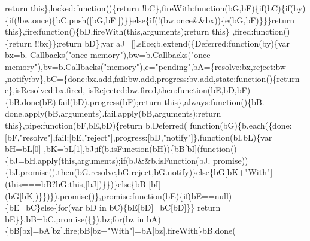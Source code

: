 \begin{DoxyCode}
{      return} \textcolor{keyword}{this}\},locked:\textcolor{keyword}{function}()\{\textcolor{keywordflow}{return} !bC\},fireWith:\textcolor{keyword}{function}(bG,bF)\{\textcolor{keywordflow}{if}(bC)\{\textcolor{keywordflow}{if}(by)\{\textcolor{keywordflow}{if}(!bw.once)\{bC.push([bG,bF
      ])\}\}\textcolor{keywordflow}{else}\{\textcolor{keywordflow}{if}(!(bw.once&&bx))\{e(bG,bF)\}\}\}\textcolor{keywordflow}{return} \textcolor{keyword}{this}\},fire:\textcolor{keyword}{function}()\{bD.fireWith(\textcolor{keyword}{this},arguments);\textcolor{keywordflow}{return} \textcolor{keyword}{this}\}
      ,fired:\textcolor{keyword}{function}()\{\textcolor{keywordflow}{return} !!bx\}\};\textcolor{keywordflow}{return} bD\};var aJ=[].slice;b.extend(\{Deferred:\textcolor{keyword}{function}(by)\{var bx=b.
      Callbacks(\textcolor{stringliteral}{"once memory"}),bw=b.Callbacks(\textcolor{stringliteral}{"once memory"}),bv=b.Callbacks(\textcolor{stringliteral}{"memory"}),e=\textcolor{stringliteral}{"pending"},bA=\{resolve:bx,reject:bw
      ,notify:bv\},bC=\{done:bx.add,fail:bw.add,progress:bv.add,state:\textcolor{keyword}{function}()\{\textcolor{keywordflow}{return} e\},isResolved:bx.fired,
      isRejected:bw.fired,then:\textcolor{keyword}{function}(bE,bD,bF)\{bB.done(bE).fail(bD).progress(bF);\textcolor{keywordflow}{return} \textcolor{keyword}{this}\},always:\textcolor{keyword}{function}()\{bB.
      done.apply(bB,arguments).fail.apply(bB,arguments);\textcolor{keywordflow}{return} \textcolor{keyword}{this}\},pipe:\textcolor{keyword}{function}(bF,bE,bD)\{\textcolor{keywordflow}{return} b.Deferred(\textcolor{keyword}{
      function}(bG)\{b.each(\{done:[bF,\textcolor{stringliteral}{"resolve"}],fail:[bE,\textcolor{stringliteral}{"reject"}],progress:[bD,\textcolor{stringliteral}{"notify"}]\},\textcolor{keyword}{function}(bI,bL)\{var bH=bL[0]
      ,bK=bL[1],bJ;\textcolor{keywordflow}{if}(b.isFunction(bH))\{bB[bI](\textcolor{keyword}{function}()\{bJ=bH.apply(\textcolor{keyword}{this},arguments);\textcolor{keywordflow}{if}(bJ&&b.isFunction(bJ.
      promise))\{bJ.promise().then(bG.resolve,bG.reject,bG.notify)\}\textcolor{keywordflow}{else}\{bG[bK+\textcolor{stringliteral}{"With"}](\textcolor{keyword}{this}===bB?bG:\textcolor{keyword}{this},[bJ])\}\})\}\textcolor{keywordflow}{else}\{bB
      [bI](bG[bK])\}\})\}).promise()\},promise:\textcolor{keyword}{function}(bE)\{\textcolor{keywordflow}{if}(bE==null)\{bE=bC\}\textcolor{keywordflow}{else}\{\textcolor{keywordflow}{for}(var bD in bC)\{bE[bD]=bC[bD]\}\}\textcolor{keywordflow}{
      return} bE\}\},bB=bC.promise(\{\}),bz;\textcolor{keywordflow}{for}(bz in bA)\{bB[bz]=bA[bz].fire;bB[bz+\textcolor{stringliteral}{"With"}]=bA[bz].fireWith\}bB.done(\textcolor{keyword}{
}
\end{DoxyCode}

